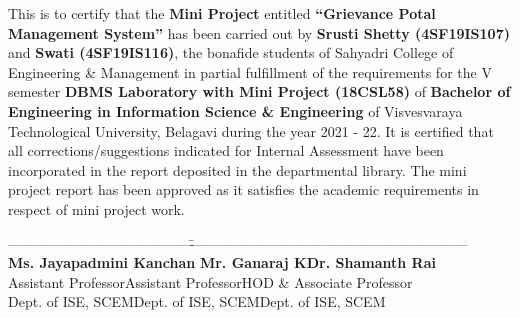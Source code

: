 \documentclass[12pt,a4paper]{report}
\begin{document}
\noindent This is to certify that the \textbf{Mini Project} entitled \textbf{``Grievance Potal Management System''}  has been carried out by
\textbf{ Srusti Shetty (4SF19IS107)} and \textbf{Swati  (4SF19IS116)}, the bonafide students of Sahyadri College of Engineering \& Management in partial fulfillment of the requirements for the V semester \textbf{DBMS Laboratory with Mini Project (18CSL58)} of \textbf{Bachelor of Engineering in Information Science \& Engineering} of Visvesvaraya Technological University, Belagavi during the year  2021 - 22. It is certified that all corrections/suggestions indicated for Internal Assessment have been incorporated in the report deposited in the departmental library. The mini project report has been approved as it satisfies the academic requirements in respect of mini project work.

\par
\vspace{0.75in}
\begin{tabbing}
\hspace{0.1in}---------------------------------------\hspace{0.3in}\=------------------------------\hspace{0.5in}------------------------------\\
\hspace{0.000025in}\textbf{    Ms. Jayapadmini Kanchan}\hspace{0.30in}\textbf{    Mr. Ganaraj K}\hspace{0.9in}\textbf{Dr. Shamanth Rai}\\
\hspace{0.40in}Assistant Professor\hspace{0.8in}Assistant Professor\hspace{0.6in}HOD \& Associate Professor\\
\hspace{0.31in}Dept. of ISE, SCEM\hspace{0.7in}Dept. of ISE, SCEM\hspace{0.8in}Dept. of ISE, SCEM\\

\end{tabbing}
\end{document}
